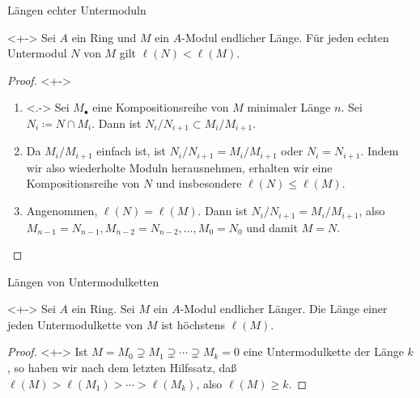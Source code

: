 \begin{frame}{Längen echter Untermoduln}
	\begin{lemma}<+->
		Sei \(A\) ein Ring und \(M\) ein \(A\)-Modul endlicher Länge.
		Für jeden echten Untermodul \(N\) von \(M\) gilt \(\ell(N) < \ell(M)\).
	\end{lemma}
	\begin{proof}<+->
		\begin{enumerate}[<+->]
		\item<.->
			Sei \(M_\bullet\) eine Kompositionsreihe von \(M\) minimaler Länge \(n\). Sei \(N_i
			\coloneqq N \cap M_i\). Dann ist \(N_i/N_{i + 1} \subset M_i/M_{i + 1}\).
		\item
			Da \(M_i/M_{i + 1}\) einfach ist, ist \(N_i/N_{i + 1} = M_i/M_{i + 1}\) oder
			\(N_i = N_{i + 1}\). Indem wir also wiederholte Moduln herausnehmen, erhalten
			wir eine Kompositionsreihe von \(N\) und insbesondere \(\ell(N) \leq \ell(M)\).
		\item
			Angenommen, \(\ell(N) = \ell(M)\). Dann ist \(N_i/N_{i + 1} = M_i/M_{i + 1}\),
			also \(M_{n - 1} = N_{n - 1}, M_{n - 2} = N_{n - 2}, \dotsc, M_0 = N_0\) und
			damit \(M = N\).
			\qedhere
		\end{enumerate}
	\end{proof}
\end{frame}

\begin{frame}{Längen von Untermodulketten}
	\begin{lemma}<+->
		Sei \(A\) ein Ring. Sei \(M\) ein \(A\)-Modul endlicher Länger. Die Länge einer jeden
		Untermodulkette von \(M\) ist höchstens \(\ell(M)\).
	\end{lemma}
	\begin{proof}<+->
		Ist \(M = M_0 \supsetneq M_1 \supsetneq \dotsb \supsetneq M_k = 0\) eine Untermodulkette
		der Länge \(k\), so haben wir nach dem letzten Hilfssatz, daß
		\(\ell(M) > \ell(M_1) > \dotsb > \ell(M_k)\), also \(\ell(M) \ge k\).
	\end{proof}
\end{frame}


